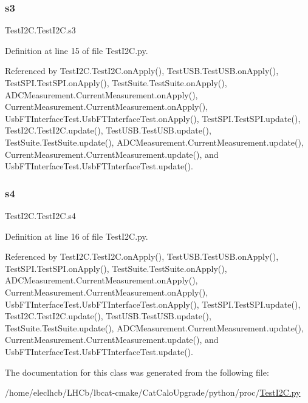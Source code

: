 \mbox{\label{classTestI2C_1_1TestI2C_a45a9468d8f8ebcf3948936beb23d84b3}} 
\subsubsection{\texorpdfstring{s3}{s3}}
{\footnotesize\ttfamily Test\+I2\+C.\+Test\+I2\+C.\+s3}



Definition at line 15 of file Test\+I2\+C.\+py.



Referenced by Test\+I2\+C.\+Test\+I2\+C.\+on\+Apply(), Test\+U\+S\+B.\+Test\+U\+S\+B.\+on\+Apply(), Test\+S\+P\+I.\+Test\+S\+P\+I.\+on\+Apply(), Test\+Suite.\+Test\+Suite.\+on\+Apply(), A\+D\+C\+Measurement.\+Current\+Measurement.\+on\+Apply(), Current\+Measurement.\+Current\+Measurement.\+on\+Apply(), Usb\+F\+T\+Interface\+Test.\+Usb\+F\+T\+Interface\+Test.\+on\+Apply(), Test\+S\+P\+I.\+Test\+S\+P\+I.\+update(), Test\+I2\+C.\+Test\+I2\+C.\+update(), Test\+U\+S\+B.\+Test\+U\+S\+B.\+update(), Test\+Suite.\+Test\+Suite.\+update(), A\+D\+C\+Measurement.\+Current\+Measurement.\+update(), Current\+Measurement.\+Current\+Measurement.\+update(), and Usb\+F\+T\+Interface\+Test.\+Usb\+F\+T\+Interface\+Test.\+update().

\mbox{\label{classTestI2C_1_1TestI2C_a44f094cf9bfdc3969deae28d12e0d3c3}} 
\subsubsection{\texorpdfstring{s4}{s4}}
{\footnotesize\ttfamily Test\+I2\+C.\+Test\+I2\+C.\+s4}



Definition at line 16 of file Test\+I2\+C.\+py.



Referenced by Test\+I2\+C.\+Test\+I2\+C.\+on\+Apply(), Test\+U\+S\+B.\+Test\+U\+S\+B.\+on\+Apply(), Test\+S\+P\+I.\+Test\+S\+P\+I.\+on\+Apply(), Test\+Suite.\+Test\+Suite.\+on\+Apply(), A\+D\+C\+Measurement.\+Current\+Measurement.\+on\+Apply(), Current\+Measurement.\+Current\+Measurement.\+on\+Apply(), Usb\+F\+T\+Interface\+Test.\+Usb\+F\+T\+Interface\+Test.\+on\+Apply(), Test\+S\+P\+I.\+Test\+S\+P\+I.\+update(), Test\+I2\+C.\+Test\+I2\+C.\+update(), Test\+U\+S\+B.\+Test\+U\+S\+B.\+update(), Test\+Suite.\+Test\+Suite.\+update(), A\+D\+C\+Measurement.\+Current\+Measurement.\+update(), Current\+Measurement.\+Current\+Measurement.\+update(), and Usb\+F\+T\+Interface\+Test.\+Usb\+F\+T\+Interface\+Test.\+update().



The documentation for this class was generated from the following file\+:\begin{DoxyCompactItemize}
\item 
/home/eleclhcb/\+L\+H\+Cb/lbcat-\/cmake/\+Cat\+Calo\+Upgrade/python/proc/\hyperlink{TestI2C_8py}{Test\+I2\+C.\+py}\end{DoxyCompactItemize}
